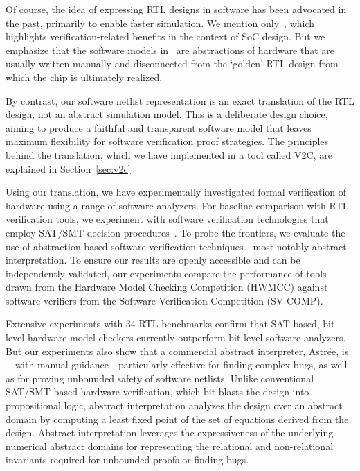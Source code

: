 Of course, the idea of expressing RTL designs in software has been
advocated in the past, primarily to enable faster simulation.  We mention
only~\cite{soc-keating}, which highlights verification-related benefits in
the context of SoC design.  But we emphasize that the software models
in~\cite{soc-keating} are abstractions of hardware that are usually written
manually and disconnected from the `golden' RTL design from which the chip
is ultimately realized.

By contrast, our software netlist representation is an exact
translation of the RTL design, not an abstract simulation model.  This is a
deliberate design choice, aiming to produce a faithful and transparent
software model that leaves maximum flexibility for software verification
proof strategies.  The principles behind the translation, which we have
implemented in a tool called V2C, are explained in Section~\ref{sec:v2c}.

Using our translation, we have experimentally investigated formal
verification of hardware using a range of software analyzers.  For
baseline comparison with RTL verification tools, we experiment with software
verification technologies that employ SAT/SMT decision
procedures~\cite{DBLP:conf/cav/BeyerK11, 2ls, cbmc.tacas:2004,
DBLP:conf/tacas/HeizmannDGLMSP16}.  To probe the frontiers, we evaluate the
use of abstraction-based software verification techniques---most notably
abstract interpretation.  To ensure our results are openly accessible and
can be independently validated, our experiments compare the performance of
tools drawn from the Hardware Model Checking Competition
(HWMCC) against software verifiers from the Software Verification
Competition (SV-COMP).

Extensive experiments with 34 RTL benchmarks confirm that SAT-based,
bit-level hardware model checkers currently outperform bit-level software
analyzers.  But our experiments also show that a commercial abstract
interpreter, Astr{\'e}e, is---with manual guidance---particularly effective for
finding complex bugs, as well as for proving unbounded safety of software netlists.  
Unlike conventional SAT/SMT-based hardware verification, which
bit-blasts the design into propositional logic, abstract interpretation
analyzes the design over an abstract domain by computing a least fixed
point of the set of equations derived from the design.  Abstract
interpretation leverages the expressiveness of the underlying
numerical abstract domains for representing the relational and
non-relational invariants required for unbounded proofs or finding bugs.

